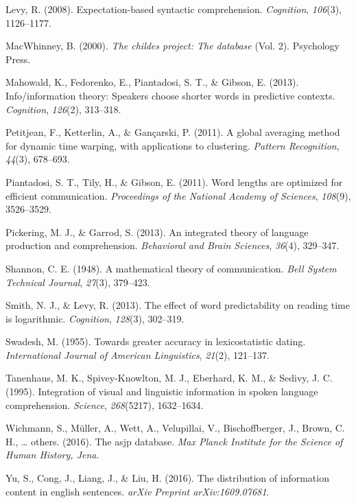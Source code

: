 \documentclass[10pt, letterpaper]{article}
\begin{document}
\leavevmode\hypertarget{ref-levy2008}{}%
Levy, R. (2008). Expectation-based syntactic comprehension.
\emph{Cognition}, \emph{106}(3), 1126--1177.

\leavevmode\hypertarget{ref-macwhinney2000}{}%
MacWhinney, B. (2000). \emph{The childes project: The database} (Vol.
2). Psychology Press.

\leavevmode\hypertarget{ref-mahowald2013}{}%
Mahowald, K., Fedorenko, E., Piantadosi, S. T., \& Gibson, E. (2013).
Info/information theory: Speakers choose shorter words in predictive
contexts. \emph{Cognition}, \emph{126}(2), 313--318.

\leavevmode\hypertarget{ref-petitjean2011}{}%
Petitjean, F., Ketterlin, A., \& Gançarski, P. (2011). A global
averaging method for dynamic time warping, with applications to
clustering. \emph{Pattern Recognition}, \emph{44}(3), 678--693.

\leavevmode\hypertarget{ref-piantadosi2011}{}%
Piantadosi, S. T., Tily, H., \& Gibson, E. (2011). Word lengths are
optimized for efficient communication. \emph{Proceedings of the National
Academy of Sciences}, \emph{108}(9), 3526--3529.

\leavevmode\hypertarget{ref-pickering2013}{}%
Pickering, M. J., \& Garrod, S. (2013). An integrated theory of language
production and comprehension. \emph{Behavioral and Brain Sciences},
\emph{36}(4), 329--347.

\leavevmode\hypertarget{ref-shannon1948}{}%
Shannon, C. E. (1948). A mathematical theory of communication.
\emph{Bell System Technical Journal}, \emph{27}(3), 379--423.

\leavevmode\hypertarget{ref-smith2013}{}%
Smith, N. J., \& Levy, R. (2013). The effect of word predictability on
reading time is logarithmic. \emph{Cognition}, \emph{128}(3), 302--319.

\leavevmode\hypertarget{ref-swadesh1955}{}%
Swadesh, M. (1955). Towards greater accuracy in lexicostatistic dating.
\emph{International Journal of American Linguistics}, \emph{21}(2),
121--137.

\leavevmode\hypertarget{ref-tanenhaus1995}{}%
Tanenhaus, M. K., Spivey-Knowlton, M. J., Eberhard, K. M., \& Sedivy, J.
C. (1995). Integration of visual and linguistic information in spoken
language comprehension. \emph{Science}, \emph{268}(5217), 1632--1634.

\leavevmode\hypertarget{ref-wichmann2016}{}%
Wichmann, S., Müller, A., Wett, A., Velupillai, V., Bischoffberger, J.,
Brown, C. H., \ldots{} others. (2016). The asjp database. \emph{Max
Planck Institute for the Science of Human History, Jena}.

\leavevmode\hypertarget{ref-yu2016}{}%
Yu, S., Cong, J., Liang, J., \& Liu, H. (2016). The distribution of
information content in english sentences. \emph{arXiv Preprint
arXiv:1609.07681}.


\end{document}
